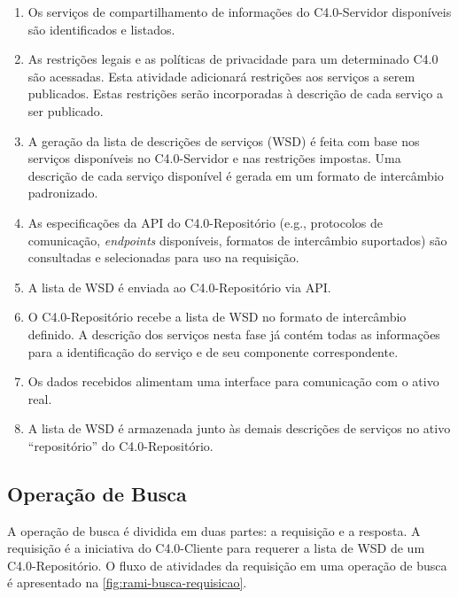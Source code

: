 	\begin{enumerate}
		
		\item Os serviços de compartilhamento de informações do C4.0-Servidor disponíveis são identificados e listados.
		
		\item As restrições legais e as políticas de privacidade para um determinado C4.0 são acessadas. Esta atividade adicionará restrições aos serviços a serem publicados. Estas restrições serão incorporadas à descrição de cada serviço a ser publicado.
		
		\item A geração da lista de descrições de serviços (WSD) é feita com base nos serviços disponíveis no C4.0-Servidor e nas restrições impostas. Uma descrição de cada serviço disponível é gerada em um formato de intercâmbio padronizado.
		
		\item As especificações da API do C4.0-Repositório (e.g., protocolos de comunicação, \textit{endpoints} disponíveis, formatos de intercâmbio suportados) são consultadas e selecionadas para uso na requisição.
		
		\item A lista de WSD é enviada ao C4.0-Repositório via API. 
		
		\item O C4.0-Repositório recebe a lista de WSD no formato de intercâmbio definido. A descrição dos serviços nesta fase já contém todas as informações para a identificação do serviço e de seu componente correspondente.
		
		\item Os dados recebidos alimentam uma interface para comunicação com o ativo real.
		
		\item A lista de WSD é armazenada junto às demais descrições de serviços no ativo ``repositório'' do C4.0-Repositório.
		
	\end{enumerate}

\subsection{Operação de Busca}

	A operação de busca é dividida em duas partes: a requisição e a resposta. A requisição é a iniciativa do C4.0-Cliente para requerer a lista de WSD de um C4.0-Repositório. O fluxo de atividades da requisição em uma operação de busca é apresentado na \autoref{fig:rami-busca-requisicao}.
	
